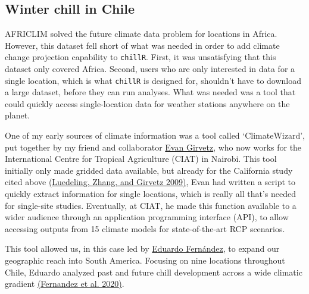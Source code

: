 \documentclass[
]{book}
\begin{document}
\hypertarget{winter-chill-in-chile}{%
\subsection{Winter chill in Chile}\label{winter-chill-in-chile}}

AFRICLIM solved the future climate data problem for locations in Africa. However, this dataset fell short of what was needed in order to add climate change projection capability to \texttt{chillR}. First, it was unsatisfying that this dataset only covered Africa. Second, users who are only interested in data for a single location, which is what \texttt{chillR} is designed for, shouldn't have to download a large dataset, before they can run analyses. What was needed was a tool that could quickly access single-location data for weather stations anywhere on the planet.

One of my early sources of climate information was a tool called `ClimateWizard', put together by my friend and collaborator \href{https://scholar.google.de/citations?user=Yh2sQY4AAAAJ\&hl=de}{Evan Girvetz}, who now works for the International Centre for Tropical Agriculture (CIAT) in Nairobi. This tool initially only made gridded data available, but already for the California study cited above \href{https://journals.plos.org/plosone/article?id=10.1371/journal.pone.0006166}{(Luedeling, Zhang, and Girvetz \protect\hyperlink{ref-luedeling_climatic_2009}{2009})}, Evan had written a script to quickly extract information for single locations, which is really all that's needed for single-site studies. Eventually, at CIAT, he made this function available to a wider audience through an application programming interface (API), to allow accessing outputs from 15 climate models for state-of-the-art RCP scenarios.

This tool allowed us, in this case led by \href{https://scholar.google.de/citations?hl=de\&user=ibSma_AAAAAJ}{Eduardo Fernández}, to expand our geographic reach into South America. Focusing on nine locations throughout Chile, Eduardo analyzed past and future chill development across a wide climatic gradient \href{https://link.springer.com/article/10.1007/s10584-019-02608-1}{(Fernandez et al. \protect\hyperlink{ref-fernandez2020prospects}{2020})}.
\end{document}
